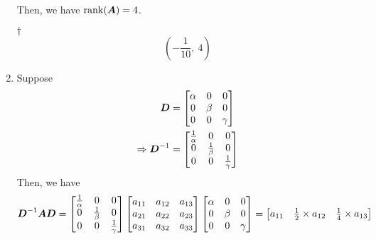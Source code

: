 \documentclass[a4paper,12pt]{article}
\begin{document}
\begin{enumerate}
\begin{equation}
    \end{equation} Then, we have $\operatorname{rank}(\boldsymbol{A}) = 4$.
    \begin{answer}{$\dag$}\begin{equation}
            (-\frac{1}{10}, \ 4)
        \end{equation}
    \end{answer}
    \item Suppose \begin{equation}
        \begin{aligned}
            \boldsymbol{D} & = \begin{bmatrix}
                \alpha & 0 & 0 \\
                0 & \beta & 0 \\
                0 & 0 & \gamma
            \end{bmatrix} \\
            \Rightarrow \boldsymbol{D}^{-1} & = \begin{bmatrix}
                \frac{1}{\alpha} & 0 & 0 \\
                0 & \frac{1}{\beta} & 0 \\
                0 & 0 & \frac{1}{\gamma}
            \end{bmatrix}
        \end{aligned}
    \end{equation} Then, we have \begin{equation}
        \boldsymbol{D}^{-1}\boldsymbol{A}\boldsymbol{D} = \begin{bmatrix}
            \frac{1}{\alpha} & 0 & 0 \\
            0 & \frac{1}{\beta} & 0 \\
            0 & 0 & \frac{1}{\gamma}
        \end{bmatrix} \begin{bmatrix}
            a_{11} & a_{12} & a_{13} \\
            a_{21} & a_{22} & a_{23} \\
            a_{31} & a_{32} & a_{33} 
        \end{bmatrix} \begin{bmatrix}
            \alpha & 0 & 0 \\
            0 & \beta & 0 \\
            0 & 0 & \gamma
        \end{bmatrix} = \begin{bmatrix}
            a_{11} & \frac{1}{2} \times a_{12} & \frac{1}{4} \times a_{13} \\

\end{bmatrix}
\end{equation}
\end{enumerate}
\end{document}
